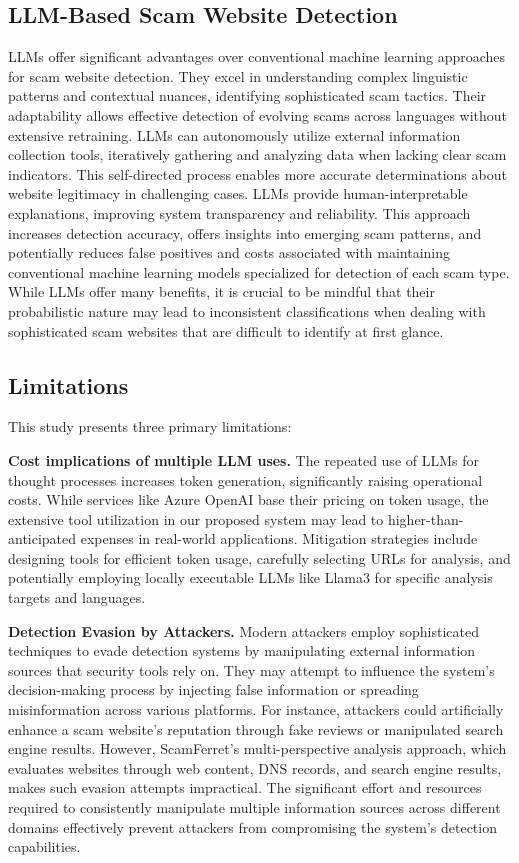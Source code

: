 \documentclass[runningheads]{llncs}
\begin{document}
\subsection{LLM-Based Scam Website Detection}
LLMs offer significant advantages over conventional machine learning approaches for scam website detection.
They excel in understanding complex linguistic patterns and contextual nuances, identifying sophisticated scam tactics.
Their adaptability allows effective detection of evolving scams across languages without extensive retraining.
LLMs can autonomously utilize external information collection tools, iteratively gathering and analyzing data when lacking clear scam indicators.
This self-directed process enables more accurate determinations about website legitimacy in challenging cases.
LLMs provide human-interpretable explanations, improving system transparency and reliability.
This approach increases detection accuracy, offers insights into emerging scam patterns, and potentially reduces false positives and costs associated with maintaining conventional machine learning models specialized for detection of each scam type.
While LLMs offer many benefits, it is crucial to be mindful that their probabilistic nature may lead to inconsistent classifications when dealing with sophisticated scam websites that are difficult to identify at first glance.

\subsection{Limitations}
This study presents three primary limitations:

\noindent\textbf{Cost implications of multiple LLM uses.}
The repeated use of LLMs for thought processes increases token generation, significantly raising operational costs.
While services like Azure OpenAI base their pricing on token usage, the extensive tool utilization in our proposed system may lead to higher-than-anticipated expenses in real-world applications.
Mitigation strategies include designing tools for efficient token usage, carefully selecting URLs for analysis, and potentially employing locally executable LLMs like Llama3 for specific analysis targets and languages.

\noindent\textbf{Detection Evasion by Attackers.}
Modern attackers employ sophisticated techniques to evade detection systems by manipulating external information sources that security tools rely on.
They may attempt to influence the system's decision-making process by injecting false information or spreading misinformation across various platforms.
For instance, attackers could artificially enhance a scam website's reputation through fake reviews or manipulated search engine results.
However, ScamFerret's multi-perspective analysis approach, which evaluates websites through web content, DNS records, and search engine results, makes such evasion attempts impractical.
The significant effort and resources required to consistently manipulate multiple information sources across different domains effectively prevent attackers from compromising the system's detection capabilities.
\end{document}
